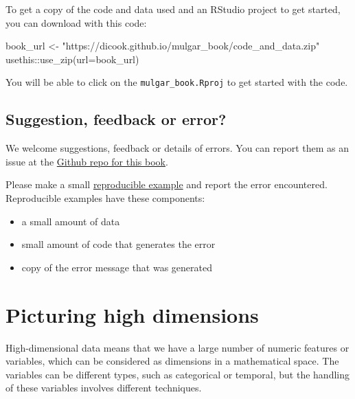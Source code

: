 \documentclass[
  letterpaper,
]{krantz}
\newenvironment{Shaded}{\begin{snugshade}}{\end{snugshade}}
\newcommand{\AttributeTok}[1]{\textcolor[rgb]{0.40,0.45,0.13}{#1}}
\newcommand{\FunctionTok}[1]{\textcolor[rgb]{0.28,0.35,0.67}{#1}}
\newcommand{\NormalTok}[1]{\textcolor[rgb]{0.00,0.23,0.31}{#1}}
\newcommand{\OtherTok}[1]{\textcolor[rgb]{0.00,0.23,0.31}{#1}}
\newcommand{\SpecialCharTok}[1]{\textcolor[rgb]{0.37,0.37,0.37}{#1}}
\newcommand{\StringTok}[1]{\textcolor[rgb]{0.13,0.47,0.30}{#1}}
\providecommand{\tightlist}{%
  \setlength{\itemsep}{0pt}\setlength{\parskip}{0pt}}\usepackage{longtable,booktabs,array}
\begin{document}
To get a copy of the code and data used and an RStudio project to get
started, you can download with this code:

\begin{Shaded}
\begin{Highlighting}[]
\NormalTok{book\_url }\OtherTok{\textless{}{-}} \StringTok{"https://dicook.github.io/mulgar\_book/code\_and\_data.zip"}
\NormalTok{usethis}\SpecialCharTok{::}\FunctionTok{use\_zip}\NormalTok{(}\AttributeTok{url=}\NormalTok{book\_url)}
\end{Highlighting}
\end{Shaded}

You will be able to click on the \texttt{mulgar\_book.Rproj} to get
started with the code.

\section*{Suggestion, feedback or
error?}\label{suggestion-feedback-or-error}


We welcome suggestions, feedback or details of errors. You can report
them as an issue at the
\href{https://github.com/dicook/mulgar_book}{Github repo for this book}.

Please make a small \href{https://reprex.tidyverse.org}{reproducible
example} and report the error encountered. Reproducible examples have
these components:

\begin{itemize}
\tightlist
\item
  a small amount of data
\item
  small amount of code that generates the error
\item
  copy of the error message that was generated
\end{itemize}


\chapter{Picturing high dimensions}\label{intro}

High-dimensional data means that we have a large number of numeric
features or variables, which can be considered as dimensions in a
mathematical space. The variables can be different types, such as
categorical or temporal, but the handling of these variables involves
different techniques. 
 
\end{document}
